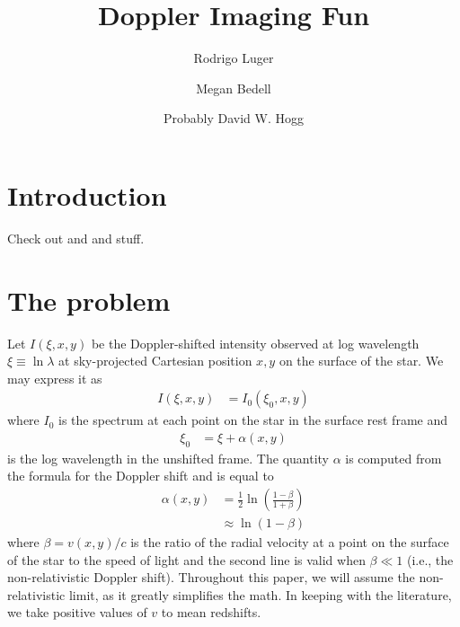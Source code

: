 \documentclass[modern]{aastex62}
\begin{document}
\title{Doppler Imaging Fun}

\author[0000-0002-0296-3826]{Rodrigo Luger}
%
\author{Megan Bedell}
%
\author{Probably David W. Hogg}

%
\section{Introduction}
%
Check out \citet{Luger2019} and \citet{Bedell2019} and stuff.

%
\section{The problem}
\label{sec:the_problem}
%
Let $I(\xi, x, y)$ be the Doppler-shifted intensity observed at log wavelength 
$\xi \equiv \ln\lambda$ at sky-projected Cartesian position $x, y$ on the 
surface of the star. We may express it as
%
\begin{align}
    \label{eq:I}
    I(\xi, x, y) &= I_0(\xi_0, x, y)
\end{align}
%
where $I_0$ is the spectrum at each point on the star in the surface rest
frame and 
%
\begin{align}
    \label{eq:xi0}
    \xi_0 &= \xi + \alpha(x, y)
\end{align}
%
is the log wavelength in the unshifted frame. The quantity $\alpha$ is
computed from the formula for the Doppler shift and is equal to
%
\begin{align}
    \label{eq:alpha}
    \alpha(x, y) 
        &=
        \frac{1}{2}\ln\left( 
            \frac{1 - \beta}{1 + \beta} 
        \right) 
        \nonumber \\
        &\approx
        \ln(1 - \beta)
\end{align}
%
where $\beta = v(x, y) / c$ is the ratio of the 
radial velocity at a point on the surface of the star to the speed of light
and the second line is valid when $\beta \ll 1$ (i.e., the non-relativistic
Doppler shift). Throughout this paper, we will assume the non-relativistic 
limit, as it greatly simplifies the math.
In keeping with the literature, we take positive values of $v$ to mean 
redshifts.
\end{document}
